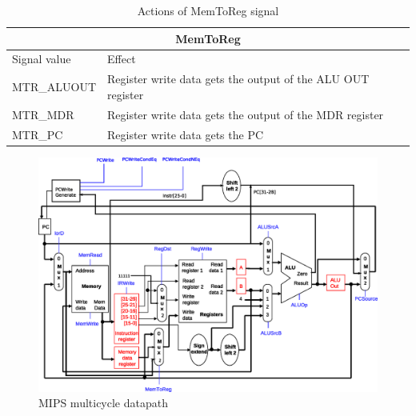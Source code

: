 \documentclass[12pt, a4paper]{article}
\begin{document}
\begin{table}[h]
  \centering
  \begin{tabular}{l | l} \hline
    \multicolumn{2}{c}{MemToReg} \\ \hline
    Signal value & Effect \\ \hline
    MTR\_ALUOUT  & Register write data gets the output of the ALU OUT register \\
    MTR\_MDR     & Register write data gets the output of the MDR register \\
    MTR\_PC      & Register write data gets the PC \\
    \hline
  \end{tabular}
  \caption{Actions of MemToReg signal}
  \label{tbl:mtr}
\end{table}

\begin{figure}[ht]
  \centering
  \includegraphics[width=6in]{images/datapath.eps}
  \caption{MIPS multicycle datapath}
  \label{fig:datapath}
\end{figure}
\end{document}
